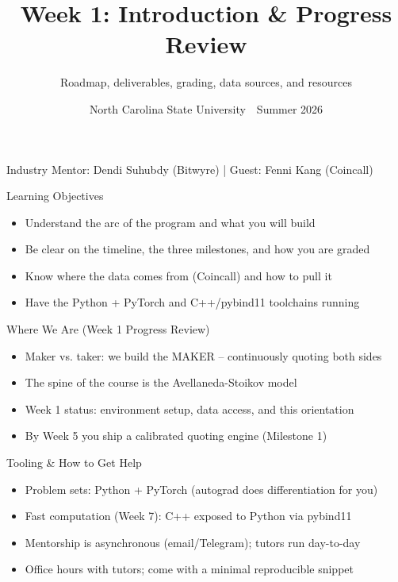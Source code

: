 \documentclass[aspectratio=169,10pt]{beamer}
\title{Week 1: Introduction \& Progress Review}
\subtitle{Roadmap, deliverables, grading, data sources, and resources}
\date{North Carolina State University \,\textbar\, Summer 2026}
\begin{document}
\begin{frame}[plain]\titlepage\begin{center}\tiny Industry Mentor: Dendi Suhubdy (Bitwyre)  |  Guest: Fenni Kang (Coincall)\end{center}\end{frame}
\begin{frame}{Learning Objectives}
\begin{itemize}
  \item Understand the arc of the program and what you will build
  \item Be clear on the timeline, the three milestones, and how you are graded
  \item Know where the data comes from (Coincall) and how to pull it
  \item Have the Python + PyTorch and C++/pybind11 toolchains running
\end{itemize}
\end{frame}

\begin{frame}{Where We Are (Week 1 Progress Review)}
\begin{itemize}
  \item Maker vs. taker: we build the MAKER -- continuously quoting both sides
  \item The spine of the course is the Avellaneda-Stoikov model
  \item Week 1 status: environment setup, data access, and this orientation
  \item By Week 5 you ship a calibrated quoting engine (Milestone 1)
\end{itemize}
\end{frame}

\begin{frame}{Tooling \& How to Get Help}
\begin{itemize}
  \item Problem sets: Python + PyTorch (autograd does differentiation for you)
  \item Fast computation (Week 7): C++ exposed to Python via pybind11
  \item Mentorship is asynchronous (email/Telegram); tutors run day-to-day
  \item Office hours with tutors; come with a minimal reproducible snippet
\end{itemize}
\end{frame}
\end{document}
